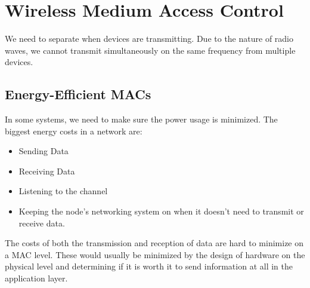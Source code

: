 \section{Wireless Medium Access Control}\label{sec:Wireless_MAC}
We need to separate when devices are transmitting.
Due to the nature of radio waves, we cannot transmit simultaneously on the same frequency from multiple devices.







\subsection{Energy-Efficient MACs}\label{subsec:Energy_Efficient_MACs}
In some systems, we need to make sure the power usage is minimized.
The biggest energy costs in a network are:
\begin{itemize}[noitemsep]
\item Sending Data
\item Receiving Data
\item Listening to the channel
\item Keeping the node's networking system on when it doesn't need to transmit or receive data.
\end{itemize}

\begin{remark*}
  The costs of both the transmission and reception of data are hard to minimize on a MAC level.
  These would usually be minimized by the design of hardware on the physical level and determining if it is worth it to send information at all in the application layer.
\end{remark*}

